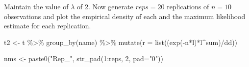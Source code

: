 \documentclass[
  letterpaper,
]{book}
\newenvironment{Shaded}{\begin{snugshade}}{\end{snugshade}}
\newcommand{\AttributeTok}[1]{\textcolor[rgb]{0.40,0.45,0.13}{#1}}
\newcommand{\DecValTok}[1]{\textcolor[rgb]{0.68,0.00,0.00}{#1}}
\newcommand{\FunctionTok}[1]{\textcolor[rgb]{0.28,0.35,0.67}{#1}}
\newcommand{\NormalTok}[1]{\textcolor[rgb]{0.00,0.23,0.31}{#1}}
\newcommand{\OtherTok}[1]{\textcolor[rgb]{0.00,0.23,0.31}{#1}}
\newcommand{\SpecialCharTok}[1]{\textcolor[rgb]{0.37,0.37,0.37}{#1}}
\newcommand{\StringTok}[1]{\textcolor[rgb]{0.13,0.47,0.30}{#1}}
\begin{document}
Maintain the value of \(\lambda\) of 2. Now generate \(reps=20\)
replications of \(n=10\) observations and plot the empirical density of
each and the maximum likelihood estimate for each replication.

\begin{Shaded}
\begin{Highlighting}[]
\NormalTok{t2 }\OtherTok{\textless{}{-}}\NormalTok{ t }\SpecialCharTok{\%\textgreater{}\%}
  \FunctionTok{group\_by}\NormalTok{(name) }\SpecialCharTok{\%\textgreater{}\%}
  \FunctionTok{mutate}\NormalTok{(}\AttributeTok{r =} \FunctionTok{list}\NormalTok{((}\FunctionTok{exp}\NormalTok{(}\SpecialCharTok{{-}}\NormalTok{n}\SpecialCharTok{*}\NormalTok{l)}\SpecialCharTok{*}\NormalTok{l}\SpecialCharTok{\^{}}\NormalTok{sum)}\SpecialCharTok{/}\NormalTok{dd))}

\NormalTok{nms }\OtherTok{\textless{}{-}} \FunctionTok{paste0}\NormalTok{(}\StringTok{"Rep\_"}\NormalTok{, }\FunctionTok{str\_pad}\NormalTok{(}\DecValTok{1}\SpecialCharTok{:}\NormalTok{reps, }\DecValTok{2}\NormalTok{, }\AttributeTok{pad=}\StringTok{"0"}\NormalTok{))}


\end{Highlighting}
\end{Shaded}
\end{document}
